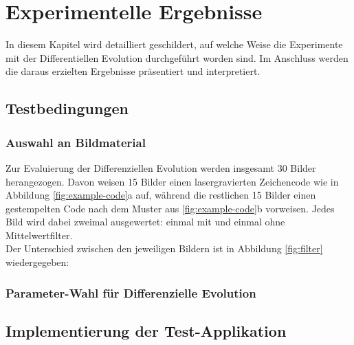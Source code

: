 \chapter{Experimentelle Ergebnisse}
\label{chap:results}
	In diesem Kapitel wird detailliert geschildert, auf welche Weise die Experimente mit der Differentiellen Evolution durchgeführt worden sind. Im Anschluss werden die daraus erzielten Ergebnisse präsentiert und interpretiert.
	
	\section{Testbedingungen}
	\label{sec:execution}
	
		\subsection{Auswahl an Bildmaterial}
		\label{sub:choice-of-images}
			Zur Evaluierung der Differenziellen Evolution werden insgesamt 30 Bilder herangezogen. Davon weisen 15 Bilder einen lasergravierten Zeichencode wie in Abbildung \ref{fig:example-code}a auf, während die restlichen 15 Bilder einen gestempelten Code nach dem Muster aus \ref{fig:example-code}b vorweisen. Jedes Bild wird dabei zweimal ausgewertet: einmal mit und einmal ohne Mittelwertfilter.\\
			Der Unterschied zwischen den jeweiligen Bildern ist in Abbildung \ref{fig:filter} wiedergegeben:
			\begin{figure}
				\centering
			\end{figure}
	
		\subsection{Parameter-Wahl für Differenzielle Evolution}
		\label{sub:de-params}
	
	\section{Implementierung der Test-Applikation}
	\label{sec:implementation}
